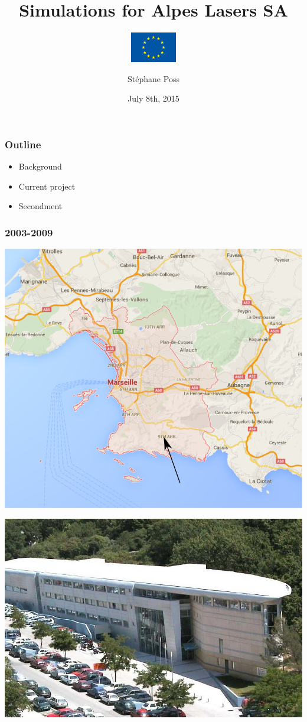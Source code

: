 \documentclass[14pt]{beamer}
\title{Simulations for Alpes Lasers SA}
\subtitle{\includegraphics[width=2cm]{europe}}
\author{St\'ephane Poss}
\date{July 8th, 2015}
\begin{document}
\begin{frame}[plain]
\titlepage
\end{frame}

\begin{frame}
\frametitle{Outline}
\begin{itemize}
\item Background
\item Current project
\item Secondment
\end{itemize}
\end{frame}

\begin{frame}
\frametitle{2003-2009}
\centering
\includegraphics[width=\textwidth]{marseille}
\end{frame}

\begin{frame}
\centering
\includegraphics[width=\textwidth]{CPPM_img1}
\end{frame}
\end{document}
